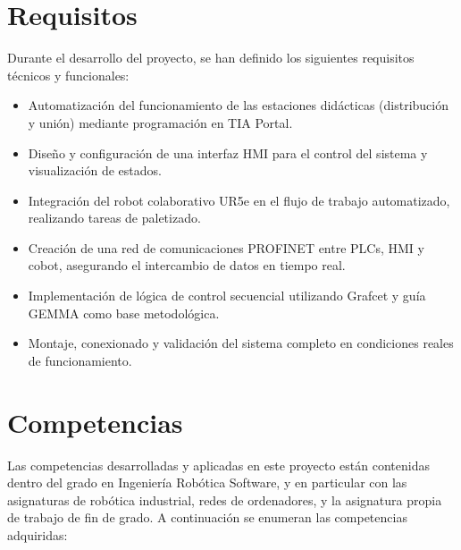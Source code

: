 \section{Requisitos}
\label{sec:requisitos}

Durante el desarrollo del proyecto, se han definido los siguientes requisitos técnicos y funcionales:

\begin{itemize}
	\item Automatización del funcionamiento de las estaciones didácticas (distribución y unión) mediante programación en TIA Portal.

	\item Diseño y configuración de una interfaz HMI para el control del sistema y visualización de estados.

	\item Integración del robot colaborativo UR5e en el flujo de trabajo automatizado, realizando tareas de paletizado.

	\item Creación de una red de comunicaciones PROFINET entre PLCs, HMI y cobot, asegurando el intercambio de datos en tiempo real.

	\item Implementación de lógica de control secuencial utilizando Grafcet y guía GEMMA como base metodológica.

	\item Montaje, conexionado y validación del sistema completo en condiciones reales de funcionamiento.
\end{itemize}

\section{Competencias}
\label{sec:competencias}

Las competencias desarrolladas y aplicadas en este proyecto están contenidas dentro del grado en Ingeniería Robótica Software, y en particular con las asignaturas de robótica industrial, redes de ordenadores, y la asignatura propia de trabajo de fin de grado. A continuación se enumeran las competencias adquiridas:

